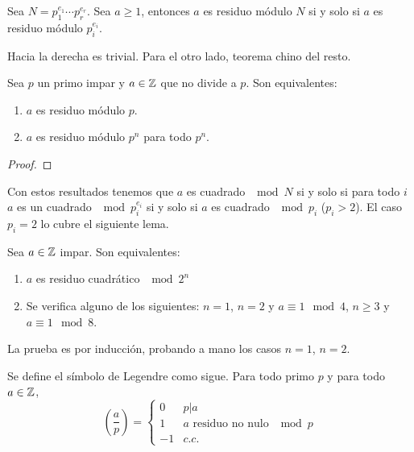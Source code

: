 \documentclass[CR.tex]{subfiles}
\begin{document}
\begin{prop}
Sea $N=p_1^{e_1}\cdots p_r^{e_r}$. Sea $a\geq 1$, entonces $a$ es residuo módulo $N$ si y solo si $a$ es residuo módulo $p_i^{e_i}$. 
\end{prop}
\begin{dem}
Hacia la derecha es trivial. Para el otro lado, teorema chino del resto.
\end{dem}

\begin{lemma}
Sea $p$ un primo impar y $a\in\mathbb{Z}$ que no divide a $p$. Son equivalentes:
\begin{enumerate}
\item $a$ es residuo módulo $p$.
\item $a$ es residuo módulo $p^n$ para todo $p^n$. 
\end{enumerate}
\end{lemma}
\begin{proof}

\end{proof}

Con estos resultados tenemos que $a$ es cuadrado $\mod N$ si y solo si para todo $i$ $a$ es un cuadrado $\mod p_i^{e_i}$ si y solo si $a$ es cuadrado $\mod  p_i$ ($p_i>2$). El caso $p_i=2$ lo cubre el siguiente lema.

\begin{lemma}
Sea $a\in\mathbb{Z}$ impar. Son equivalentes:
\begin{enumerate}
\item $a$ es residuo cuadrático $\mod 2^n$
\item Se verifica alguno de los siguientes: $n=1$, $n=2$ y $a\equiv 1\mod 4$, $n\geq 3$ y $a\equiv 1\mod 8$.
\end{enumerate}
\end{lemma}
La prueba es por inducción, probando a mano los casos $n=1$, $n=2$. 

\begin{defi}
Se define el símbolo de Legendre como sigue. Para todo primo $p$ y para todo $a\in\mathbb{Z}$, 
$$\left(\frac{a}{p}\right)=\begin{cases}
0 & p|a\\
1 & a \text{ residuo no nulo }\mod p\\
-1 & c.c.
\end{cases}$$
\end{defi}
\end{document}

